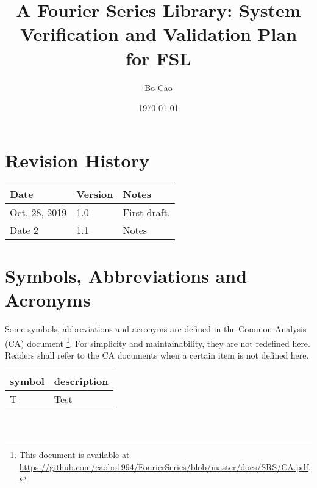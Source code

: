 \documentclass[12pt, titlepage]{article}
\begin{document}
\title{A Fourier Series Library: System Verification and Validation Plan for FSL} 
\author{Bo Cao}
\date{\today}
	
\maketitle


\section{Revision History}

\begin{tabularx}{\textwidth}{p{3cm}p{2cm}X}
\toprule {\bf Date} & {\bf Version} & {\bf Notes}\\
\midrule
Oct. 28, 2019  & 1.0 & First draft.\\
Date 2 & 1.1 & Notes\\
\bottomrule
\end{tabularx}

\newpage

\tableofcontents

\listoftables

\listoffigures

\newpage

\section{Symbols, Abbreviations and Acronyms}

Some symbols, abbreviations and acronyms are defined in the Common Analysis (CA) document \footnote{This document is available at \url{https://github.com/caobo1994/FourierSeries/blob/master/docs/SRS/CA.pdf}.}. For simplicity and maintainability, they are not redefined here. Readers shall refer to the CA documents when a certain item is not defined here.

\vspace{1cm}

\renewcommand{\arraystretch}{1.2}
\begin{tabular}{l l} 
  \toprule		
  \textbf{symbol} & \textbf{description}\\
  \midrule 
  T & Test\\
  \bottomrule
\end{tabular}\\

\newpage

\end{document}
